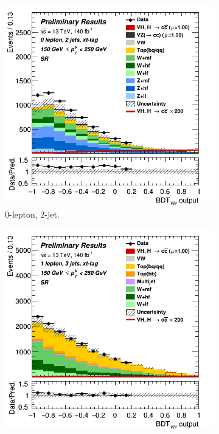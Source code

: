 \begin{figure}[h!]
  \centering
  \begin{subfigure}[b]{0.32\textwidth}
      \centering
      \includegraphics[width=\textwidth]{Images/VH/Own_fit/prefit_VHcc/Region_distmva_BMax250_BMin150_DSR_J2_TTypext_T2_L0_Y6051_Prefit.png}
      \caption{0-lepton, 2-jet.}
      \label{fig:plots_VHcc_ex_OL_SR_2C}
  \end{subfigure}
  \begin{subfigure}[b]{0.32\textwidth}
      \centering
      \includegraphics[width=\textwidth]{Images/VH/Own_fit/prefit_VHcc/Region_distmva_BMax250_BMin150_DSR_J3_TTypext_T2_L1_Y6051_Prefit.png}

\end{subfigure}
\end{figure}
